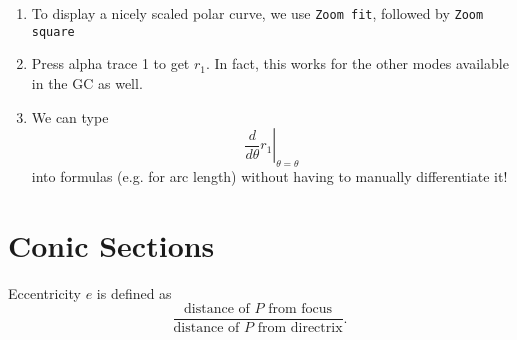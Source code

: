 \documentclass[oneside]{book}
\begin{document}
\begin{GCSkills}{}
  \begin{enumerate}
    \item To display a nicely scaled polar curve, we use \texttt{Zoom fit}, followed by \texttt{Zoom square}
    \item Press alpha trace 1 to get \(r_1\). In fact, this works for the other modes available in the GC as well. 
    \item We can type 
    \[\left. \frac{d}{d\theta}r_1 \right\rvert_{\theta=\theta}\] 
    into formulas (e.g. for arc length) without having to manually differentiate it!
  \end{enumerate}
\end{GCSkills}

\chapter{Conic Sections}
\begin{definition}{}{}
  Eccentricity \(e\) is defined as 
  \[\frac{\text{distance of \(P\) from focus}}{\text{distance of \(P\) from directrix}}.\]
\end{definition}
\end{document}
